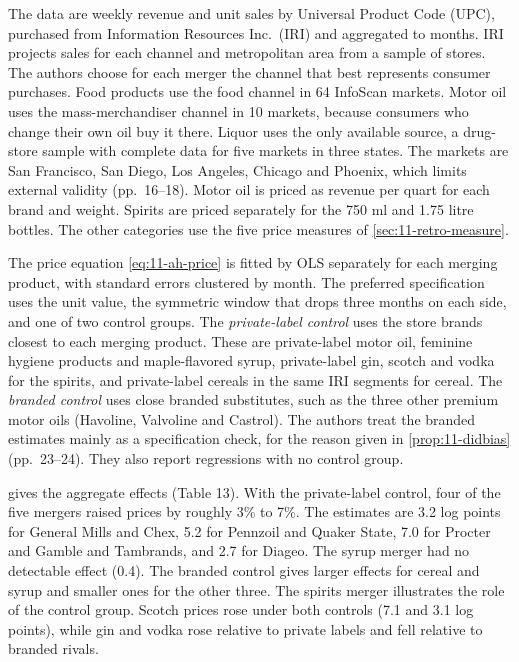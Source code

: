  The data are weekly revenue and unit sales by Universal Product Code (UPC), purchased from
Information Resources Inc.\ (IRI) and aggregated to months. IRI projects sales for each channel and metropolitan
area from a sample of stores. The authors choose for each merger the channel that best represents consumer
purchases. Food products use the food channel in 64 InfoScan markets. Motor oil uses the mass-merchandiser channel
in 10 markets, because consumers who change their own oil buy it there. Liquor uses the only available source, a
drug-store sample with complete data for five markets in three states. The markets are San Francisco, San Diego,
Los Angeles, Chicago and Phoenix, which limits external validity (pp.~16--18). Motor oil is priced as revenue per quart for
each brand and weight. Spirits are priced separately for the 750 ml and 1.75 litre bottles. The other categories
use the five price measures of \cref{sec:11-retro-measure}.

 The price equation \eqref{eq:11-ah-price} is fitted by OLS separately for each merging
product, with standard errors clustered by month. The preferred specification uses the unit value, the symmetric
window that drops three months on each side, and one of two control groups. The \emph{private-label control} uses
the store brands closest to each merging product. These are private-label motor oil, feminine hygiene products and
maple-flavored syrup, private-label gin, scotch and vodka for the spirits, and private-label cereals in the same
IRI segments for cereal. The \emph{branded control} uses close branded substitutes, such as the three other premium motor oils
(Havoline, Valvoline and Castrol). The authors treat the branded estimates mainly as a specification check, for the
reason given in \cref{prop:11-didbias} (pp.~23--24). They also report regressions with no control group.

  gives the aggregate effects (Table 13). With the private-label control, four of
the five mergers raised prices by roughly 3\% to 7\%. The estimates are 3.2 log points for General Mills and Chex,
5.2 for Pennzoil and Quaker State, 7.0 for Procter and Gamble and Tambrands, and 2.7 for Diageo. The syrup merger had no
detectable effect (0.4). The branded control gives larger effects for cereal and syrup and smaller ones for the
other three. The spirits merger illustrates the role of the control group. Scotch prices rose under both controls
(7.1 and 3.1 log points), while gin and vodka rose relative to private labels and fell relative to branded
rivals.

